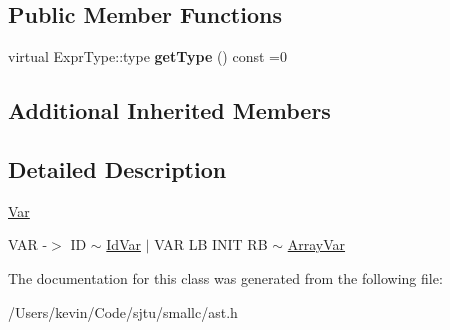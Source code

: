\subsection*{Public Member Functions}
\begin{DoxyCompactItemize}
\item 
\mbox{\label{class_var_ae7b58bfb649ef44ae9ac3cc33a6b39c4}} 
virtual Expr\+Type\+::type {\bfseries get\+Type} () const =0
\end{DoxyCompactItemize}
\subsection*{Additional Inherited Members}


\subsection{Detailed Description}
\hyperlink{class_var}{Var}

V\+AR -\/$>$ ID $\sim$ \hyperlink{class_id_var}{Id\+Var} $\vert$ V\+AR LB I\+N\+IT RB $\sim$ \hyperlink{class_array_var}{Array\+Var} 

The documentation for this class was generated from the following file\+:\begin{DoxyCompactItemize}
\item 
/\+Users/kevin/\+Code/sjtu/smallc/ast.\+h\end{DoxyCompactItemize}

